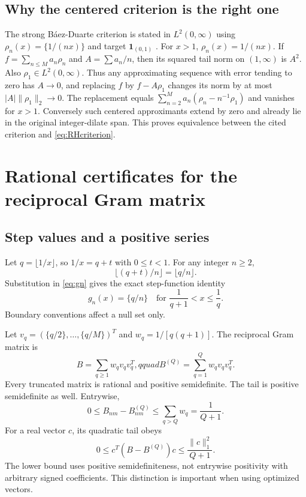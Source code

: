 \documentclass[11pt]{amsart}
\theoremstyle{definition}
\begin{document}
\subsection{Why the centered criterion is the right one}
The strong B\'aez-Duarte criterion is stated in $L^2(0,\infty)$ using
$\rho_n(x)=\{1/(nx)\}$ and target $\boldsymbol1_{(0,1)}$
\cite{BD}. For $x>1$, $\rho_n(x)=1/(nx)$. If
$f=\sum_{n\le M}a_n\rho_n$ and $A=\sum a_n/n$, then its squared
tail norm on $(1,\infty)$ is $A^2$. Also $\rho_1\in L^2(0,\infty)$.
Thus any approximating sequence with error tending to zero has $A\to0$,
and replacing $f$ by $f-A\rho_1$ changes its norm by at most
$|A|\|\rho_1\|_2\to0$. The replacement equals
$\sum_{n=2}^M a_n(\rho_n-n^{-1}\rho_1)$ and vanishes for $x>1$.
Conversely such centered approximants extend by zero and already lie
in the original integer-dilate span. This proves equivalence between
the cited criterion and \eqref{eq:RHcriterion}.

\section{Rational certificates for the reciprocal Gram matrix}
\subsection{Step values and a positive series}
Let $q=\lfloor1/x\rfloor$, so $1/x=q+t$ with $0\le t<1$. For any
integer $n\ge2$,
\[
 \lfloor(q+t)/n\rfloor=\lfloor q/n\rfloor.
\]
Substitution in \eqref{eq:gn} gives the exact step-function identity
\begin{equation}\label{eq:step}
 g_n(x)=\{q/n\}\quad\text{for }\frac1{q+1}<x\le\frac1q.
\end{equation}
Boundary conventions affect a null set only.

Let $v_q=(\{q/2\},\ldots,\{q/M\})^T$ and
$w_q=1/[q(q+1)]$. The reciprocal Gram matrix is
\begin{equation}\label{eq:Bseries}
 B=\sum_{q\ge1}w_qv_qv_q^T,qquad
 B^{(Q)}=\sum_{q=1}^Qw_qv_qv_q^T.
\end{equation}
Every truncated matrix is rational and positive semidefinite. The
tail is positive semidefinite as well. Entrywise,
\begin{equation}\label{eq:tailentry}
 0\le B_{nm}-B^{(Q)}_{nm}\le\sum_{q>Q}w_q=\frac1{Q+1}.
\end{equation}
For a real vector $c$, its quadratic tail obeys
\begin{equation}\label{eq:tailquad}
 0\le c^T(B-B^{(Q)})c\le\frac{\|c\|_1^2}{Q+1}.
\end{equation}
The lower bound uses positive semidefiniteness, not entrywise
positivity with arbitrary signed coefficients. This distinction is
important when using optimized vectors.
\end{document}
